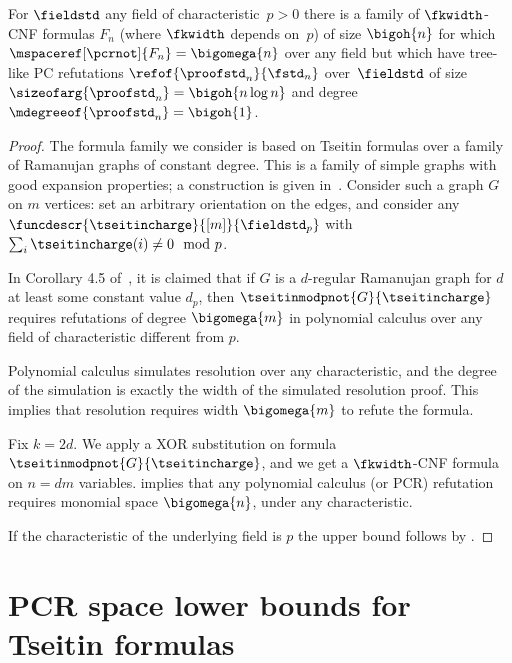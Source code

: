 \begin{theorem}
  For $\fieldstd$ any field of characteristic~$p>0$
  there is a family of
  \mbox{$\fkwidth$-CNF} formulas
  $F_n$
  (where $\fkwidth$ depends on~$p$)
  of size $\bigoh{n}$
  for which
%
  $\mspaceref[\pcrnot]{F_{n}}=\bigomega{n}$
  over any field
  but  which have tree-like PC refutations
  $\refof{\proofstd_n}{\fstd_n}$ 
  over~$\fieldstd$
  of size
  $\sizeofarg{\proofstd_n}=\bigoh{n\log n}$
  and degree
  $\mdegreeof{\proofstd_n}=\bigoh{1}$.
\end{theorem}
\begin{proof}
  The formula family we consider is based on Tseitin formulas over a
  family of Ramanujan graphs of constant degree. This is a family of
  simple graphs with good expansion properties; a construction is
  given in~\cite{Morgenstern1994}.  Consider such a graph $G$ on $m$
  vertices: set an arbitrary orientation on the edges, and consider
  any $\funcdescr{\tseitincharge}{[m]}{\fieldstd_p}$ with
  $\sum_{i}\tseitincharge(i)\not=0 \mod{p}$.
  
  In Corollary 4.5 of~\cite{AR03LowerBounds}, it is claimed that if
  $G$ is a $d$-regular Ramanujan graph for $d$ at least some constant value
  $d_{p}$, then $\tseitinmodpnot{G}{\tseitincharge}$ requires
  refutations of degree $\bigomega{m}$ in polynomial calculus over any
  field of characteristic different from $p$.

  Polynomial calculus simulates resolution over any characteristic,
  and the degree of the simulation is exactly the width of the
  simulated resolution proof. This implies that resolution requires
  width $\bigomega{m}$ to refute the formula.

  Fix $k=2d$. We apply a XOR substitution on formula
  $\tseitinmodpnot{G}{\tseitincharge}$, and 
  we get a $\fkwidth$-CNF formula on $n=dm$
  variables.  implies that any polynomial calculus (or PCR) refutation requires monomial space $\bigomega{n}$, under
  any characteristic.

  If the characteristic of the underlying field is $p$ the upper bound
  follows by .
\end{proof}

%
%
%
\section{PCR space lower bounds for Tseitin formulas}
\label{sec:small-cycles}

